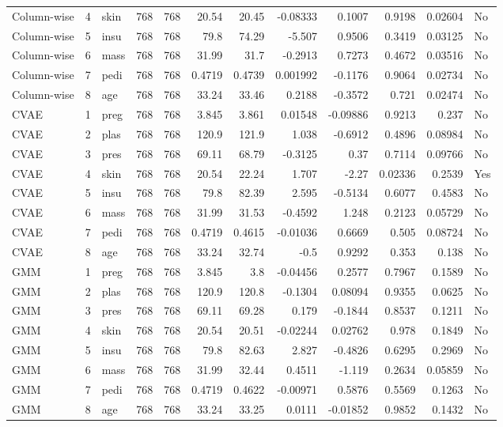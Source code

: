 \begin{longtable}{lrp{}rrrrrrrrl}
Column-wise & 4 & skin & 768 & 768 & 20.54 & 20.45 & -0.08333 & 0.1007 & 0.9198 & 0.02604 & No \\
Column-wise & 5 & insu & 768 & 768 & 79.8 & 74.29 & -5.507 & 0.9506 & 0.3419 & 0.03125 & No \\
Column-wise & 6 & mass & 768 & 768 & 31.99 & 31.7 & -0.2913 & 0.7273 & 0.4672 & 0.03516 & No \\
Column-wise & 7 & pedi & 768 & 768 & 0.4719 & 0.4739 & 0.001992 & -0.1176 & 0.9064 & 0.02734 & No \\
Column-wise & 8 & age & 768 & 768 & 33.24 & 33.46 & 0.2188 & -0.3572 & 0.721 & 0.02474 & No \\
CVAE & 1 & preg & 768 & 768 & 3.845 & 3.861 & 0.01548 & -0.09886 & 0.9213 & 0.237 & No \\
CVAE & 2 & plas & 768 & 768 & 120.9 & 121.9 & 1.038 & -0.6912 & 0.4896 & 0.08984 & No \\
CVAE & 3 & pres & 768 & 768 & 69.11 & 68.79 & -0.3125 & 0.37 & 0.7114 & 0.09766 & No \\
CVAE & 4 & skin & 768 & 768 & 20.54 & 22.24 & 1.707 & -2.27 & 0.02336 & 0.2539 & Yes \\
CVAE & 5 & insu & 768 & 768 & 79.8 & 82.39 & 2.595 & -0.5134 & 0.6077 & 0.4583 & No \\
CVAE & 6 & mass & 768 & 768 & 31.99 & 31.53 & -0.4592 & 1.248 & 0.2123 & 0.05729 & No \\
CVAE & 7 & pedi & 768 & 768 & 0.4719 & 0.4615 & -0.01036 & 0.6669 & 0.505 & 0.08724 & No \\
CVAE & 8 & age & 768 & 768 & 33.24 & 32.74 & -0.5 & 0.9292 & 0.353 & 0.138 & No \\
GMM & 1 & preg & 768 & 768 & 3.845 & 3.8 & -0.04456 & 0.2577 & 0.7967 & 0.1589 & No \\
GMM & 2 & plas & 768 & 768 & 120.9 & 120.8 & -0.1304 & 0.08094 & 0.9355 & 0.0625 & No \\
GMM & 3 & pres & 768 & 768 & 69.11 & 69.28 & 0.179 & -0.1844 & 0.8537 & 0.1211 & No \\
GMM & 4 & skin & 768 & 768 & 20.54 & 20.51 & -0.02244 & 0.02762 & 0.978 & 0.1849 & No \\
GMM & 5 & insu & 768 & 768 & 79.8 & 82.63 & 2.827 & -0.4826 & 0.6295 & 0.2969 & No \\
GMM & 6 & mass & 768 & 768 & 31.99 & 32.44 & 0.4511 & -1.119 & 0.2634 & 0.05859 & No \\
GMM & 7 & pedi & 768 & 768 & 0.4719 & 0.4622 & -0.00971 & 0.5876 & 0.5569 & 0.1263 & No \\
GMM & 8 & age & 768 & 768 & 33.24 & 33.25 & 0.0111 & -0.01852 & 0.9852 & 0.1432 & No \\
\end{longtable}
